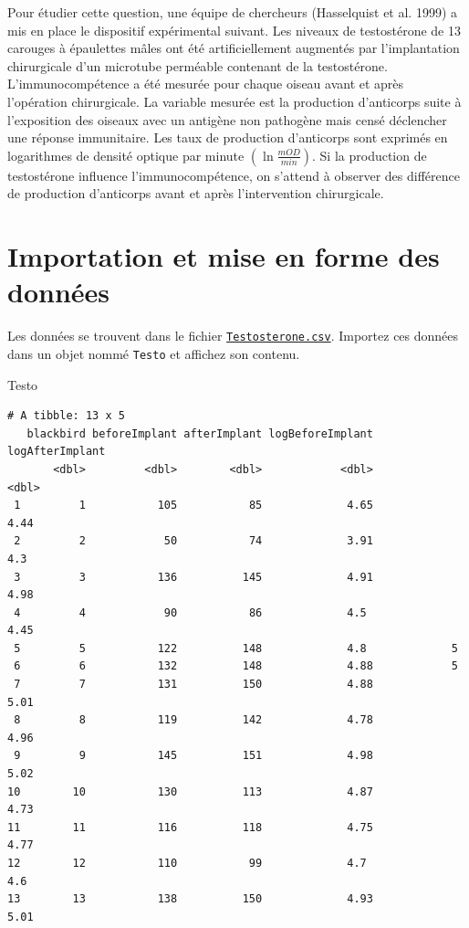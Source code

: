 \documentclass[
  a4paper,
  DIV=11,
  numbers=noendperiod,
  oneside]{scrreprt}
\newenvironment{Shaded}{}{}
\newcommand{\NormalTok}[1]{\textcolor[rgb]{0.14,0.16,0.18}{#1}}
\begin{document}
Pour étudier cette question, une équipe de chercheurs (Hasselquist et
al. 1999) a mis en place le dispositif expérimental suivant. Les niveaux
de testostérone de 13 carouges à épaulettes mâles ont été
artificiellement augmentés par l'implantation chirurgicale d'un
microtube perméable contenant de la testostérone. L'immunocompétence a
été mesurée pour chaque oiseau avant et après l'opération chirurgicale.
La variable mesurée est la production d'anticorps suite à l'exposition
des oiseaux avec un antigène non pathogène mais censé déclencher une
réponse immunitaire. Les taux de production d'anticorps sont exprimés en
logarithmes de densité optique par minute
\(\left(\ln\frac{mOD}{min}\right)\). Si la production de testostérone
influence l'immunocompétence, on s'attend à observer des différence de
production d'anticorps avant et après l'intervention chirurgicale.

\hypertarget{importation-et-mise-en-forme-des-donnuxe9es-1}{%
\section{Importation et mise en forme des
données}\label{importation-et-mise-en-forme-des-donnuxe9es-1}}

Les données se trouvent dans le fichier
\href{data/Testosterone.csv}{\texttt{Testosterone.csv}}. Importez ces
données dans un objet nommé \texttt{Testo} et affichez son contenu.

\begin{Shaded}
\begin{Highlighting}[]
\NormalTok{Testo}
\end{Highlighting}
\end{Shaded}

\begin{verbatim}
# A tibble: 13 x 5
   blackbird beforeImplant afterImplant logBeforeImplant logAfterImplant
       <dbl>         <dbl>        <dbl>            <dbl>           <dbl>
 1         1           105           85             4.65            4.44
 2         2            50           74             3.91            4.3 
 3         3           136          145             4.91            4.98
 4         4            90           86             4.5             4.45
 5         5           122          148             4.8             5   
 6         6           132          148             4.88            5   
 7         7           131          150             4.88            5.01
 8         8           119          142             4.78            4.96
 9         9           145          151             4.98            5.02
10        10           130          113             4.87            4.73
11        11           116          118             4.75            4.77
12        12           110           99             4.7             4.6 
13        13           138          150             4.93            5.01
\end{verbatim}
\end{document}
